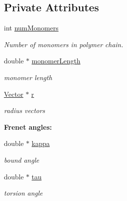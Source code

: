 \subsection*{Private Attributes}
\begin{DoxyCompactItemize}
\item 
int \hyperlink{class_p_c_a_1_1_polymer_a8dadd2d6d6d65b79909f274acd63fd1e}{num\+Monomers}
\begin{DoxyCompactList}\small\item\em Number of monomers in polymer chain. \end{DoxyCompactList}\item 
double $\ast$ \hyperlink{class_p_c_a_1_1_polymer_adec33c5274834c85479abefe537efa5a}{monomer\+Length}
\begin{DoxyCompactList}\small\item\em monomer length \end{DoxyCompactList}\item 
\hyperlink{class_p_c_a_1_1_vector}{Vector} $\ast$ \hyperlink{class_p_c_a_1_1_polymer_a9822e3b9c3420a04a689706b84e586ca}{r}
\begin{DoxyCompactList}\small\item\em radius vectors \end{DoxyCompactList}\end{DoxyCompactItemize}
\begin{Indent}{\bf Frenet angles\+:}\par
\begin{DoxyCompactItemize}
\item 
double $\ast$ \hyperlink{class_p_c_a_1_1_polymer_a1bef29f1613bb4b67981aae7df3d804b}{kappa}
\begin{DoxyCompactList}\small\item\em bound angle \end{DoxyCompactList}\item 
double $\ast$ \hyperlink{class_p_c_a_1_1_polymer_ab3b07298bdbac01a7b20b2554d7b248f}{tau}
\begin{DoxyCompactList}\small\item\em torsion angle \end{DoxyCompactList}\end{DoxyCompactItemize}
\end{Indent}
